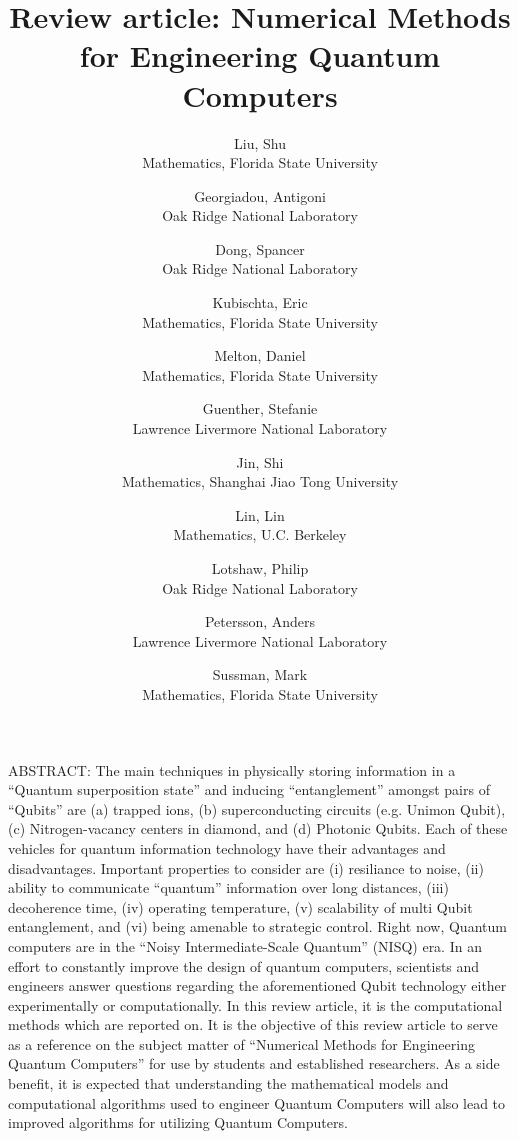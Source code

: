 \documentclass[]{article}
\title{Review article: Numerical Methods for Engineering Quantum Computers}
\author{
  Liu, Shu \\
  Mathematics, Florida State University
  \and
  Georgiadou, Antigoni \\
  Oak Ridge National Laboratory
  \and
  Dong, Spancer \\
  Oak Ridge National Laboratory
  \and
  Kubischta, Eric \\
  Mathematics, Florida State University
  \and
  Melton, Daniel \\
  Mathematics, Florida State University
  \and
  Guenther, Stefanie \\
  Lawrence Livermore National Laboratory
  \and
  Jin, Shi \\
  Mathematics, Shanghai Jiao Tong University
  \and
  Lin, Lin \\
  Mathematics, U.C. Berkeley
  \and
  Lotshaw, Philip \\
  Oak Ridge National Laboratory
  \and
  Petersson, Anders \\
  Lawrence Livermore National Laboratory
  \and
  Sussman, Mark \\
  Mathematics, Florida State University
}
\begin{document}
\maketitle

ABSTRACT:
The main techniques in physically storing information in a ``Quantum superposition state'' and inducing ``entanglement'' amongst pairs of ``Qubits'' are (a) trapped ions, (b) superconducting circuits (e.g. Unimon Qubit), (c) Nitrogen-vacancy centers in diamond, and (d) Photonic Qubits.  Each of these vehicles for quantum information technology have their advantages and disadvantages.  Important properties to consider are (i) resiliance to noise, (ii) ability to communicate ``quantum'' information over long distances, (iii) decoherence time, (iv) operating temperature, (v) scalability of multi Qubit entanglement, and (vi) being amenable to strategic control.  Right now, Quantum computers are in the ``Noisy Intermediate-Scale Quantum'' (NISQ) era.  In an effort to constantly improve the design of quantum computers, scientists and engineers answer questions regarding the aforementioned Qubit technology either experimentally or computationally.  In this review article, it is the computational methods which are reported on.  It is the objective of this review article to serve as a reference on the subject matter of ``Numerical Methods for Engineering Quantum Computers'' for use by students and established researchers.  As a side benefit, it is expected that understanding the mathematical models and computational algorithms used to engineer Quantum Computers will also lead to improved algorithms for utilizing Quantum Computers.

\begin{comment}

\section{Guest Editors}

\begin{itemize}
\item
Mark Sussman, Florida State University \verb=sussman@math.fsu.edu=
\item
Lin Lin, University of California, Berkeley \verb=linlin@math.berkeley.edu=
\item
Shi Jin, Shanghai Jiao Tong University \verb=shijin-m@sjtu.edu.cn=
\item
Stefanie Guenther, Lawrence Livermore National Laboratory
\verb=guenther5@llnl.gov=
\item
Anders Petersson, Lawrence Livermore National Laboratory
\verb=petersson1@llnl.gov=
\item
Philip Lotshaw, Oak Ridge National Laboratory
\verb=lotshawpc@ornl.gov=
\end{itemize}

\end{comment}
\end{document}
